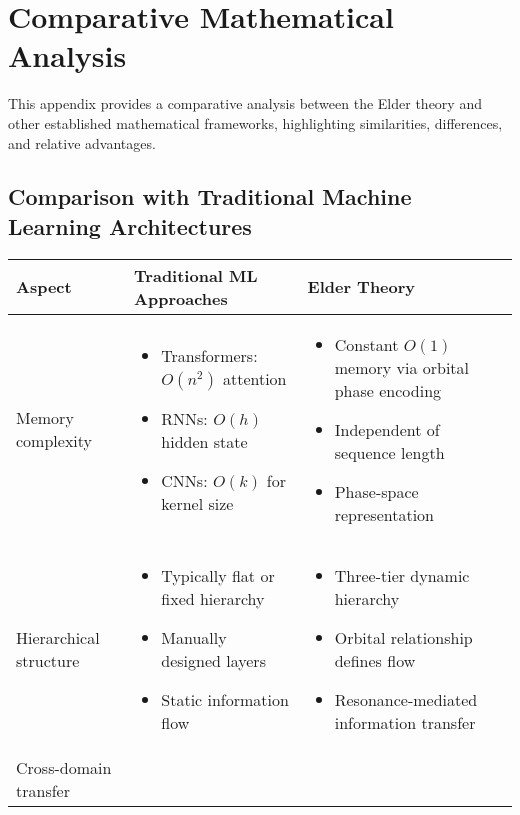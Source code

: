 \chapter{Comparative Mathematical Analysis}

This appendix provides a comparative analysis between the Elder theory and other established mathematical frameworks, highlighting similarities, differences, and relative advantages.

\section{Comparison with Traditional Machine Learning Architectures}

\begin{center}
\begin{tabular}{|p{3cm}|p{5cm}|p{5cm}|}
\hline
\textbf{Aspect} & \textbf{Traditional ML Approaches} & \textbf{Elder Theory} \\
\hline
Memory complexity & 
\begin{itemize}
    \item Transformers: $O(n^2)$ attention
    \item RNNs: $O(h)$ hidden state
    \item CNNs: $O(k)$ for kernel size
\end{itemize} &
\begin{itemize}
    \item Constant $O(1)$ memory via orbital phase encoding
    \item Independent of sequence length
    \item Phase-space representation
\end{itemize} \\
\hline
Hierarchical structure & 
\begin{itemize}
    \item Typically flat or fixed hierarchy
    \item Manually designed layers
    \item Static information flow
\end{itemize} &
\begin{itemize}
    \item Three-tier dynamic hierarchy
    \item Orbital relationship defines flow
    \item Resonance-mediated information transfer
\end{itemize} \\
\hline
Cross-domain transfer & 

\end{tabular}
\end{center}
